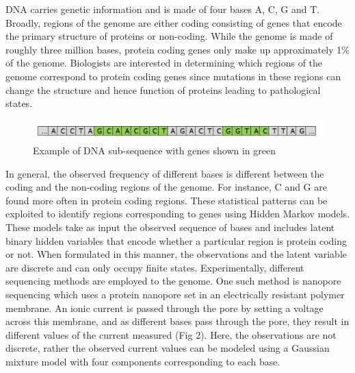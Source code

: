 \documentclass[11pt]{article}
\begin{document}
DNA carries genetic information and is made of four bases A, C, G and T. Broadly, regions of the genome are either coding consisting of genes that encode the primary structure of proteins or non-coding. While the genome is made of roughly three million bases, protein coding genes only make up approximately 1\% of the genome. Biologists are interested in determining which regions of the genome correspond to protein coding genes since mutations in these regions can change the structure and hence function of proteins leading to pathological states. 
\begin{figure}[h]
    \centering
    \includegraphics[width=1.0\textwidth]{genome.png}
    \caption{Example of DNA sub-sequence with genes shown in green}
    \label{Fig 1}
\end{figure}
\newline
In general, the observed frequency of different bases is different between the coding and the non-coding regions of the genome. For instance, C and G are found more often in protein coding regions. These statistical patterns can be exploited to identify regions corresponding to genes using Hidden Markov models. These models take as input the observed sequence of bases and includes latent binary hidden variables that encode whether a particular region is protein coding or not. When formulated in this manner, the observations and the latent variable are discrete and can only occupy finite states. 
\newline
\newline
Experimentally, different sequencing methods are employed to  the genome. One such method is nanopore sequencing which uses a protein nanopore set in an electrically resistant polymer membrane. An ionic current is passed through the pore by setting a voltage across this membrane, and as different bases pass through the pore, they result in different values of the current measured (Fig 2). Here, the observations are not discrete, rather the observed current values can be modeled using a Gaussian mixture model with four components corresponding to each base.  
\end{document}
